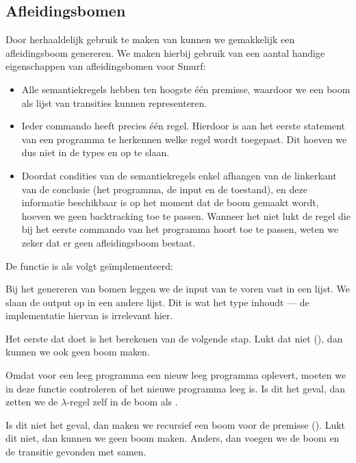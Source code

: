\subsection{Afleidingsbomen}
Door herhaaldelijk gebruik te maken van  kunnen we gemakkelijk een
afleidingsboom genereren. We maken hierbij gebruik van een aantal handige
eigenschappen van afleidingsbomen voor Smurf:

\begin{itemize}
	\item Alle semantiekregels hebben ten hoogste één premisse, waardoor we een
		boom als lijst van transities kunnen representeren.
	\item Ieder commando heeft precies één regel. Hierdoor is aan het eerste
		statement van een programma te herkennen welke regel wordt toegepast. Dit
		hoeven we dus niet in de types  en  op te
		slaan.
	\item Doordat condities van de semantiekregels enkel afhangen van de
		linkerkant van de conclusie (het programma, de input en de toestand), en
		deze informatie beschikbaar is op het moment dat de boom gemaakt wordt,
		hoeven we geen backtracking toe te passen. Wanneer het niet lukt de regel
		die bij het eerste commando van het programma hoort toe te passen, weten we
		zeker dat er geen afleidingsboom bestaat.
\end{itemize}

De functie  is als volgt geïmplementeerd:



Bij het genereren van bomen leggen we de input van te voren vast in een lijst.
We slaan de output op in een andere lijst. Dit is wat het type 
inhoudt --- de implementatie hiervan is irrelevant hier.

Het eerste dat  doet is het berekenen van de volgende stap. Lukt dat
niet (), dan kunnen we ook geen boom maken.

Omdat  voor een leeg programma een nieuw leeg programma oplevert,
moeten we in deze functie controleren of het nieuwe programma leeg is. Is dit
het geval, dan zetten we de $\lambda$-regel zelf in de boom als .

Is dit niet het geval, dan maken we recursief een boom voor de premisse
(). Lukt dit niet, dan kunnen we geen boom maken.
Anders, dan voegen we de boom en de transitie gevonden met  samen.
